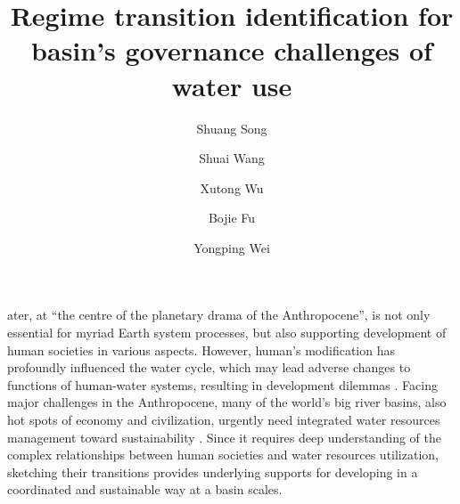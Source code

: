\documentclass[9pt, twocolumn, twoside, lineno]{pnas-new}
\title{Regime transition identification for basin's governance challenges of water use}
\author[a, b]{Shuang Song}  %
\author[a, b, 1]{Shuai Wang}  %
\author[c, d]{Xutong Wu}  %
\author[a, b]{Bojie Fu}  %
\author[e]{Yongping Wei} %
\affil[a]{ %
	State Key Laboratory of Earth Surface Processes and Resource Ecology, 
	Faculty of Geographical Science, 
	Beijing Normal University, 
	Beijing 100875, 
	P.R. China
}
\affil[b]{ %
	Institute of Land Surface System and Sustainability, 
	Faculty of Geographical Science, 
	Beijing Normal University, 
	Beijing 100875, 
	P.R. China
}
\affil[c]{ %
	College of Urban and Environmental Sciences, 
	Peking University, 
	Beijing 100871, 
	P.R. China
}
\affil[d]{ %
	State Key Laboratory of Urban and Regional Ecology, 
	Research Center for Eco-Environmental Sciences, 
	Chinese Academy of Sciences, 
	Beijing 100085, 
	P.R. China 
}
\affil[e]{ %
	School of Earth and Environmental Sciences, 
	The University of Queensland, 
	Brisbane 4067, 
	Australia
}
\begin{document}
\maketitle
\thispagestyle{firststyle}

\label{introduction}
ater, at “the centre of the planetary drama of the Anthropocene”, is not only essential for myriad Earth system processes, but also supporting development of human societies in various aspects. 
However, human's modification has profoundly influenced the water cycle, which may lead adverse changes to functions of human-water systems, resulting in development dilemmas \cite{gleesonIlluminatingWaterCycle2020,cummingLinkingEconomicGrowth2018}.
Facing major challenges in the Anthropocene, many of the world's big river basins, also hot spots of economy and civilization, urgently need integrated water resources management toward sustainability \cite{bestAnthropogenicStressesWorld2019}. 
Since it requires deep understanding of the complex relationships between human societies and water resources utilization, sketching their transitions provides underlying supports for developing in a coordinated and sustainable way at a basin scales.
\end{document}
